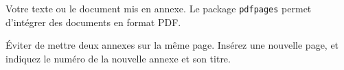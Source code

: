 \newpage
\section*{}

Votre texte ou le document mis en annexe. Le package \verb?pdfpages? permet d'intégrer des documents en format PDF.

Éviter de mettre deux annexes sur la même page. Insérez une nouvelle page, et indiquez le numéro de la nouvelle annexe et son titre.

